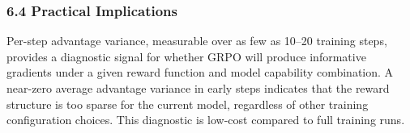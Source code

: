 \subsubsection{6.4 Practical Implications}

Per-step advantage variance, measurable over as few as 10–20 training steps, provides a diagnostic signal for whether GRPO will produce informative gradients under a given reward function and model capability combination. A near-zero average advantage variance in early steps indicates that the reward structure is too sparse for the current model, regardless of other training configuration choices. This diagnostic is low-cost compared to full training runs.
